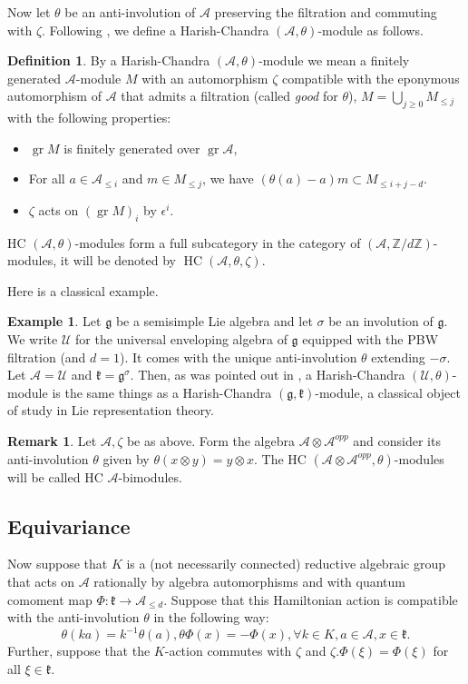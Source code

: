 \documentclass[12pt]{amsart}
\newcommand{\A}{\mathcal{A}}
\newcommand{\U}{\mathcal{U}}
\newcommand{\g}{\mathfrak{g}}
\newcommand{\Z}{\mathbb{Z}}
\newcommand{\gr}{\operatorname{gr}}
\newcommand{\kf}{\mathfrak{k}}
\newcommand{\HC}{\operatorname{HC}}
\theoremstyle{definition}
\newtheorem{Ex}[Thm]{Example}
\newtheorem{defi}[Thm]{Definition}
\newtheorem{Rem}[Thm]{Remark}
\numberwithin{equation}{section}
\begin{document}
Now let $\theta$ be an anti-involution of $\A$ preserving the filtration and commuting with $\zeta$. Following \cite[Section 6.1]{Wdim},
we define a Harish-Chandra $(\A,\theta)$-module as follows.

\begin{defi}\label{defi:HC} By a Harish-Chandra $(\A,\theta)$-module we mean a finitely generated
$\A$-module $M$ with an automorphism $\zeta$ compatible with the eponymous automorphism
of $\A$ that admits a filtration (called {\it good} for $\theta$),
$M=\bigcup_{j\geqslant 0}M_{\leqslant j}$
with the following properties:
\begin{itemize}
\item[(i)] $\gr M$ is finitely generated over $\gr\A$,
\item[(ii)] For all $a\in \A_{\leqslant i}$ and $m\in M_{\leqslant j}$,
we have $(\theta(a)-a)m\subset M_{\leqslant i+j-d}$.
\item[(iii)] $\zeta$ acts on $(\gr M)_i$ by $\epsilon^i$.
\end{itemize}
\end{defi}

HC $(\A,\theta)$-modules form a full subcategory in the category of $(\A,\Z/d\Z)$-modules, it will be denoted by
$\HC(\A,\theta,\zeta)$. 

Here is a classical example.
\begin{Ex}\label{Ex:HC_classical}
Let $\g$ be a semisimple Lie algebra and let
$\sigma$ be an involution of $\g$. We write $\U$ for the universal
enveloping algebra of $\g$ equipped with the PBW filtration (and $d=1$). It comes with
the unique anti-involution $\theta$ extending $-\sigma$.
Let $\A=\U$ and $\kf=\g^\sigma$. Then, as was pointed out in
\cite[Section 6.1]{Wdim}, a Harish-Chandra $(\U,\theta)$-module is the same
things as a Harish-Chandra $(\g,\kf)$-module, a classical object of
study in Lie representation theory.
\end{Ex}

\begin{Rem}\label{Rem:HC_bimodules}
Let $\A,\zeta$ be as above. Form the algebra $\A\otimes \A^{opp}$ and consider its anti-involution
$\theta$ given by $\theta(x\otimes y)=y\otimes x$. The HC $(\A\otimes \A^{opp},\theta)$-modules will
be called HC $\A$-bimodules.
\end{Rem}


\subsection{Equivariance}
Now suppose that $K$ is a (not necessarily connected) reductive algebraic group that acts on
$\A$ rationally by algebra automorphisms and  with quantum comoment map $\Phi: \mathfrak{k}\rightarrow \A_{\leqslant d}$.
Suppose that this Hamiltonian action is compatible with
the anti-involution $\theta$ in the following way:
\begin{equation}\label{eq:action_compatible}
\theta(ka)=k^{-1}\theta(a),\theta \Phi(x)=-\Phi(x),\forall k\in K, a\in \A, x\in \mathfrak{k}.
\end{equation}
Further, suppose that the $K$-action commutes with $\zeta$ and $\zeta.\Phi(\xi)=\Phi(\xi)$
for all $\xi\in \kf$.
\end{document}

